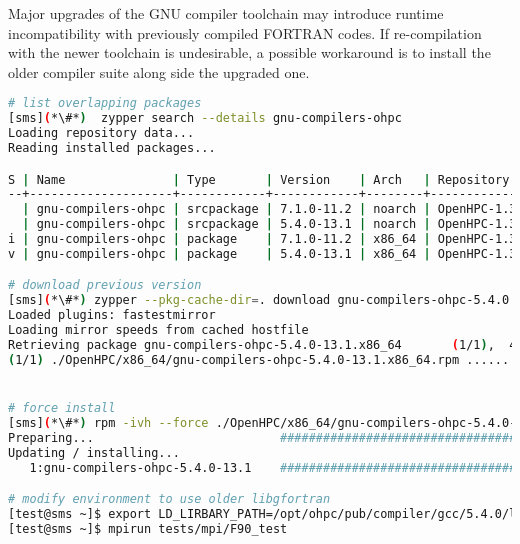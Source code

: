 \begin{center}
\begin{tcolorbox}[]
\small Major upgrades of the GNU compiler toolchain may introduce runtime 
incompatibility with previously compiled FORTRAN codes. If re-compilation with the 
newer toolchain is undesirable, a possible workaround is to install the older 
compiler suite along side the upgraded one.

\begin{lstlisting}[language=bash,keywords={}]
# list overlapping packages
[sms](*\#*)  zypper search --details gnu-compilers-ohpc
Loading repository data...
Reading installed packages...

S | Name               | Type       | Version    | Arch   | Repository                        
--+--------------------+------------+------------+--------+-----------------------------------
  | gnu-compilers-ohpc | srcpackage | 7.1.0-11.2 | noarch | OpenHPC-1.3 - Updates             
  | gnu-compilers-ohpc | srcpackage | 5.4.0-13.1 | noarch | OpenHPC-1.3 - Base                
i | gnu-compilers-ohpc | package    | 7.1.0-11.2 | x86_64 | OpenHPC-1.3 - Updates             
v | gnu-compilers-ohpc | package    | 5.4.0-13.1 | x86_64 | OpenHPC-1.3 - Base                

# download previous version
[sms](*\#*) zypper --pkg-cache-dir=. download gnu-compilers-ohpc-5.4.0
Loaded plugins: fastestmirror
Loading mirror speeds from cached hostfile
Retrieving package gnu-compilers-ohpc-5.4.0-13.1.x86_64       (1/1),  43.9 MiB (233.1 MiB unpacked)
(1/1) ./OpenHPC/x86_64/gnu-compilers-ohpc-5.4.0-13.1.x86_64.rpm .............................[done]


# force install
[sms](*\#*) rpm -ivh --force ./OpenHPC/x86_64/gnu-compilers-ohpc-5.4.0-13.1.x86_64.rpm
Preparing...                          ################################# [100%]
Updating / installing...
   1:gnu-compilers-ohpc-5.4.0-13.1    ################################# [100%]

# modify environment to use older libgfortran
[test@sms ~]$ export LD_LIRBARY_PATH=/opt/ohpc/pub/compiler/gcc/5.4.0/lib64:${LD_LIBRARY_PATH}
[test@sms ~]$ mpirun tests/mpi/F90_test
\end{lstlisting}
\end{tcolorbox}
\end{center}

